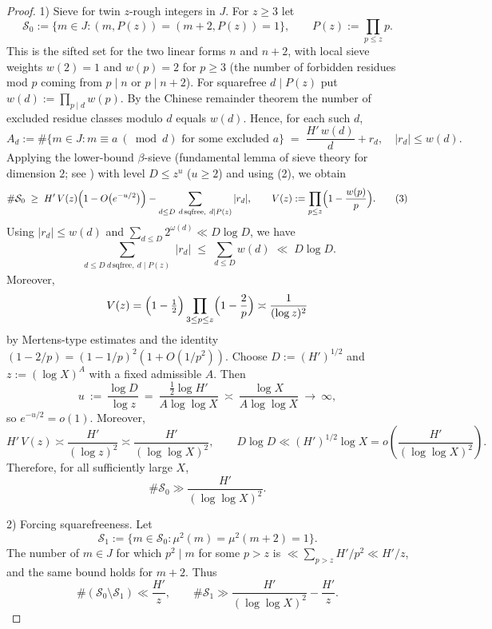\begin{proof}
1) Sieve for twin $z$-rough integers in $J$. For $z\ge 3$ let
$$\mathcal{S}_0:=\{m\in J : (m,P(z))=(m+2,P(z))=1\},\qquad P(z):=\prod_{p\le z}p.$$
This is the sifted set for the two linear forms $n$ and $n+2$, with local sieve weights $w(2)=1$ and $w(p)=2$ for $p\ge 3$ (the number of forbidden residues mod $p$ coming from $p\mid n$ or $p\mid n+2$). For squarefree $d\mid P(z)$ put $w(d):=\prod_{p\mid d}w(p)$. By the Chinese remainder theorem the number of excluded residue classes modulo $d$ equals $w(d)$. Hence, for each such $d$,
$$A_d:=\#\{m\in J: m\equiv a\ (\bmod d)\text{ for some excluded }a\}\;=\;\frac{H'\,w(d)}{d}+r_d,\quad |r_d|\le w(d).\tag{2}$$
Applying the lower-bound $\beta$-sieve (fundamental lemma of sieve theory for dimension $2$; see \cite{Greaves2001,IK2004}) with level $D\le z^u$ ($u\ge 2$) and using (2), we obtain
$$\#\mathcal{S}_0\;\ge\;H'\,V(z)\Bigl(1-O\bigl(e^{-u/2}\bigr)\Bigr)-\sum_{\substack{d\le D\ d\,\text{sqfree},\ d\mid P(z)}}|r_d|,\qquad V(z):=\prod_{p\le z}\Bigl(1-\frac{w(p)}{p}\Bigr).\tag{3}$$
Using $|r_d|\le w(d)$ and $\sum_{d\le D}2^{\omega(d)}\ll D\log D$, we have
$$\sum_{\substack{d\le D\ d\,\text{sqfree},\ d\mid P(z)}}|r_d|\;\le\;\sum_{d\le D}w(d)\;\ll\;D\log D.\tag{4}$$
Moreover,
$$V(z)=\Bigl(1-\tfrac12\Bigr)\prod_{3\le p\le z}\Bigl(1-\frac{2}{p}\Bigr)\asymp \frac{1}{(\log z)^2}$$
by Mertens-type estimates \cite{Apostol1976} and the identity $(1-2/p)=(1-1/p)^2(1+O(1/p^2))$.
Choose $D:=(H')^{1/2}$ and $z:=(\log X)^A$ with a fixed admissible $A$. Then
\[
 u\ :=\ \frac{\log D}{\log z}\ =\ \frac{\tfrac12\log H'}{A\log\log X}\ \asymp\ \frac{\log X}{A\log\log X}\ \longrightarrow\ \infty,
\]
so $e^{-u/2}=o(1)$. Moreover,
$$H'\,V(z)\asymp \frac{H'}{(\log z)^2}\asymp \frac{H'}{(\log\log X)^2},\qquad D\log D\ll (H')^{1/2}\log X=o\!\left(\frac{H'}{(\log\log X)^2}\right).$$
Therefore, for all sufficiently large $X$,
$$\#\mathcal{S}_0\gg \frac{H'}{(\log\log X)^2}.\tag{5}$$

2) Forcing squarefreeness. Let
$$\mathcal{S}_1:=\{m\in\mathcal{S}_0: \mu^2(m)=\mu^2(m+2)=1\}.$$
The number of $m\in J$ for which $p^2\mid m$ for some $p>z$ is $\ll\sum_{p>z} H'/p^2\ll H'/z$, and the same bound holds for $m+2$. Thus
$$\#(\mathcal{S}_0\setminus\mathcal{S}_1)\ll \frac{H'}{z},\qquad \#\mathcal{S}_1\gg \frac{H'}{(\log\log X)^2}-\frac{H'}{z}.\tag{6}$$


\end{proof}
